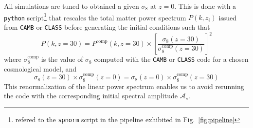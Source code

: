 All simulations are tuned to obtained a given $\sigma_8$ at $z=0$. This is done with a \texttt{python} script\footnote{refered to the \texttt{spnorm} script in the pipeline exhibited in Fig.~\ref{fig:pipeline}} that
rescales the total matter power spectrum $P(k, z_i)$ issued from \texttt{CAMB} or \texttt{CLASS} before generating the initial conditions
such that 
\begin{equation}
\label{eq:sig8norm}
P(k, z=30) = P^{\mathrm{comp}}(k, z=30) \times \left[ \frac{\sigma_8(z=30)}{\sigma_8^{\mathrm{comp}}(z=30)} \right]^2 
\end{equation} where $\sigma_8^{\mathrm{comp}}$ is the value of $\sigma_8$ computed with the \texttt{CAMB} or \texttt{CLASS} code for a chosen cosmological model, and 
\begin{equation}
\sigma_8(z=30) \times \sigma_8^{\mathrm{comp}} (z=0) = \sigma_8 (z=0) \times \sigma_8^{\mathrm{comp}}(z=30)
\end{equation}
This renormalization of the linear power spectrum enables us to avoid rerunning the code with the corresponding initial spectral amplitude $\mathcal{A}_s$. \\

